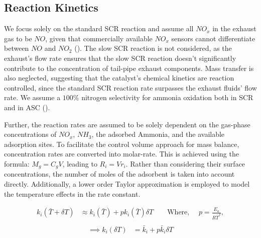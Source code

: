 \subsection{Reaction Kinetics}
We focus solely on the standard SCR reaction and assume all $NO_x$ in the
exhaust gas to be $NO$, given that commercially available $NO_x$ sensors cannot
differentiate between $NO$ and $NO_2$ (\cite{nova2014urea}). The slow SCR
reaction is not considered, as the exhaust's flow rate ensures that the slow
SCR reaction doesn't significantly contribute to the concentration of tail-pipe
exhaust components. Mass transfer is also neglected, suggesting that the
catalyst's chemical kinetics are reaction controlled, since the standard SCR
reaction rate surpasses the exhaust fluids' flow rate. We assume a $100\%$
nitrogen selectivity for ammonia oxidation both in SCR and in ASC
(\cite{jain2023diagnostics}).


Further, the reaction rates are assumed to be solely dependent on the gas-phase
concentrations of $NO_x$, $NH_3$, the adsorbed Ammonia, and the available
adsorption sites. To facilitate the control volume approach for mass balance,
concentration rates are converted into molar-rate. This is achieved using the
formula: $M_g = C_g V$, leading to $R_i = V r_i$. Rather than considering their
surface concentrations, the number of moles of the adsorbent is taken into
account directly. Additionally, a lower order Taylor approximation is employed
to model the temperature effects in the rate constant.

\begin{align*}
    k_i(\bar T + \delta T) &\approx k_i(\bar T) + p k_i(\bar T) \delta T\qquad
    \text{Where, }\quad   p = \frac{E_a}{R\bar{T}^2},\\
\end{align*}
\begin{align}
    \implies k_i(\delta T) &= \bar k_i + p \bar k_i \delta T
    \label{eqn::rate_approx}
\end{align}

